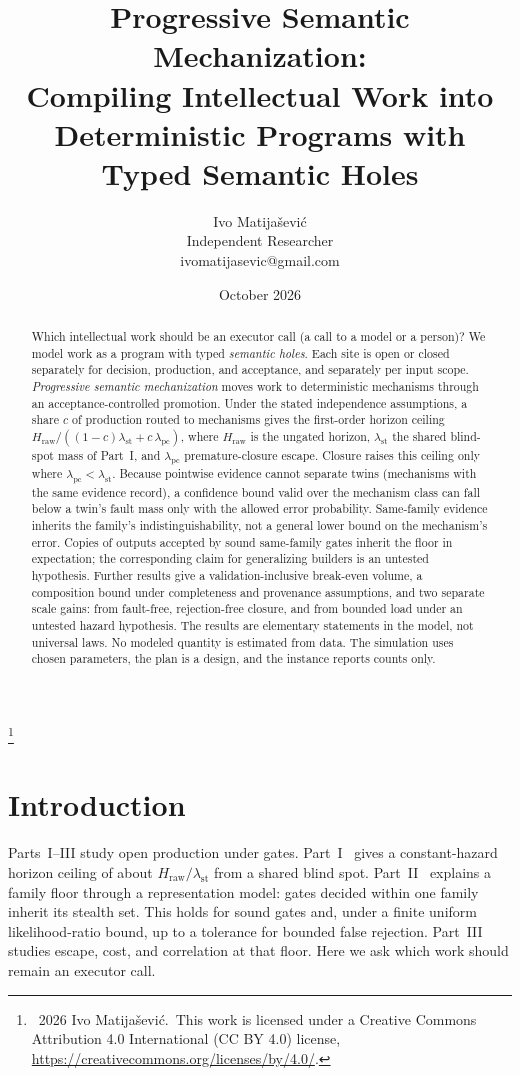 \documentclass[11pt]{article}
\title{\vspace{-2em}Progressive Semantic Mechanization:\\
\large Compiling Intellectual Work into Deterministic Programs with Typed Semantic Holes}
\author{Ivo Matija\v{s}evi\'c\\ \small Independent Researcher \\ \small ivomatijasevic@gmail.com}
\date{October 2026}
\theoremstyle{definition}
\theoremstyle{remark}
\newcommand{\lst}{\lambda_{\mathrm{st}}}
\newcommand{\Hraw}{H_{\mathrm{raw}}}
\newcommand\blfootnote[1]{\begingroup\renewcommand\thefootnote{}\footnote{#1}\addtocounter{footnote}{-1}\endgroup}
\newcommand{\lpc}{\lambda_{\mathrm{pc}}}
\begin{document}
\maketitle
\blfootnote{\textcopyright~2026 Ivo Matija\v{s}evi\'c.\ This work is licensed under a Creative Commons
Attribution 4.0 International (CC BY 4.0) license, \url{https://creativecommons.org/licenses/by/4.0/}.}

\begin{abstract}
Which intellectual work should be an executor call (a call to a model or a person)? We model work as a program with typed
\emph{semantic holes}. Each site is open or closed separately for decision, production, and
acceptance, and separately per input scope. \emph{Progressive semantic mechanization} moves work
to deterministic mechanisms through an acceptance-controlled promotion.
Under the stated independence assumptions, a share $c$ of production routed to mechanisms gives the first-order
horizon ceiling $\Hraw/((1-c)\lst+c\,\lpc)$, where $\Hraw$ is the ungated horizon, $\lst$ the shared blind-spot mass of Part~I, and $\lpc$
premature-closure escape.
Closure raises this ceiling only where $\lpc<\lst$.
Because pointwise evidence cannot separate twins (mechanisms with the same evidence record), a
confidence bound valid over the mechanism class can fall below a twin's fault mass only with
the allowed error probability. Same-family evidence inherits the family's indistinguishability,
not a general lower bound on the mechanism's error. Copies of outputs accepted by sound
same-family gates inherit the floor in expectation; the corresponding claim for generalizing
builders is an untested hypothesis.
Further results give a validation-inclusive break-even volume, a composition bound under
completeness and provenance assumptions, and two separate scale gains: from fault-free,
rejection-free closure, and from bounded load under an untested hazard hypothesis.
The results are elementary statements in the model, not universal laws. No modeled quantity is
estimated from data. The simulation uses chosen parameters, the plan is a design, and the instance
reports counts only.
\end{abstract}

\section{Introduction}\label{sec:intro}
Parts~I--III study open production under gates. Part~I~\cite{matijasevic2026n1} gives a
constant-hazard horizon ceiling of about $\Hraw/\lst$ from a shared blind spot.
Part~II~\cite{matijasevic2026gg} explains a family floor through a representation model:
gates decided within one family inherit its stealth set. This holds for sound gates and, under a
finite uniform likelihood-ratio bound, up to a tolerance for bounded false rejection.
Part~III~\cite{matijasevic2026floor} studies escape, cost, and correlation at that floor.
Here we ask which work should remain an executor call.
\end{document}
